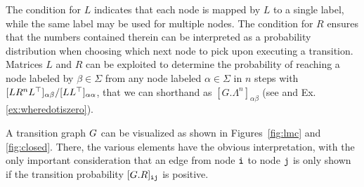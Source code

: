 The condition for $L$ indicates that each node is mapped by $L$ to a single label, while the same label may be used for multiple nodes. The condition for $R$ ensures that the numbers contained therein can be interpreted as a probability distribution when choosing which next node to pick upon executing a transition. Matrices $L$ and $R$ can be exploited to determine the probability of reaching a node labeled by $\beta\in\Sigma$ from any node labeled $\alpha\in\Sigma$ in $n$ steps with $[LR^nL^\top]_{\alpha\beta}/[LL^\top]_{\alpha\alpha}$, that we can shorthand as $[G.\Lambda^n]_{\alpha\beta}$ (see \cite{GartnerFW03} and Ex. \ref{ex:wheredotiszero}).

A transition graph $G$ can be visualized as shown in Figures~\eqref{fig:lmc} and \eqref{fig:closed}. There, the various elements have the obvious interpretation, with the only important consideration that an edge from node $\textnormal{\texttt{i}}$ to node $\textnormal{\texttt{j}}$ is only shown if the transition probability $[G.R]_{\textnormal{\texttt{i}}\textnormal{\texttt{j}}}$ is positive.

%


